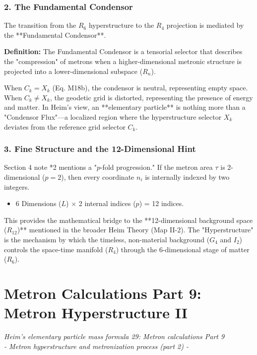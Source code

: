 \documentclass[11pt,a4paper,oneside]{article}
\begin{document}
\subsubsection*{2. The Fundamental Condensor}
The transition from the $R_6$ hyperstructure to the $R_4$ projection is mediated by the **Fundamental Condensor**.
\begin{mbbcite}
    \textbf{Definition:} The Fundamental Condensor is a tensorial selector that describes the "compression" of metrons when a higher-dimensional metronic structure is projected into a lower-dimensional subspace ($R_n$).
\end{mbbcite}
When $C_k = X_k$ (Eq. M18b), the condensor is neutral, representing empty space. When $C_k \neq X_k$, the geodetic grid is distorted, representing the presence of energy and matter. In Heim's view, an **elementary particle** is nothing more than a "Condensor Flux"—a localized region where the hyperstructure selector $X_k$ deviates from the reference grid selector $C_k$.

\subsubsection*{3. Fine Structure and the 12-Dimensional Hint}
Section 4 note *2 mentions a "$p$-fold progression." If the metron area $\tau$ is 2-dimensional ($p=2$), then every coordinate $n_i$ is internally indexed by two integers.
\begin{itemize}
    \item 6 Dimensions ($L$) $\times$ 2 internal indices ($p$) = 12 indices.
\end{itemize}
This provides the mathematical bridge to the **12-dimensional background space ($R_{12}$)** mentioned in the broader Heim Theory (Map II-2). The "Hyperstructure" is the mechanism by which the timeless, non-material background ($G_4$ and $I_2$) controls the space-time manifold ($R_4$) through the 6-dimensional stage of matter ($R_6$).
\section{Metron Calculations Part 9: Metron Hyperstructure II}
\textit{Heim's elementary particle mass formula 29: Metron calculations Part 9 \\ - Metron hyperstructure and metronization process (part 2) -}
\end{document}
